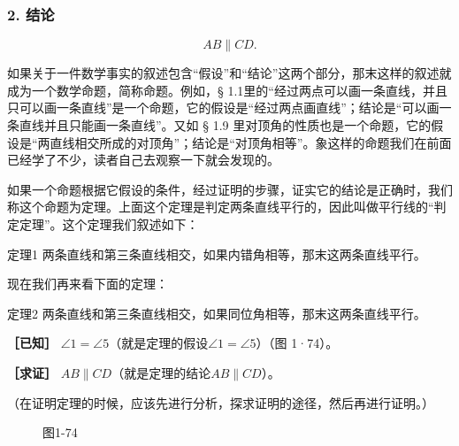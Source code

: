 \subsubsection{2. 结论}

\[
AB \parallel CD.
\]

如果关于一件数学事实的叙述包含``假设''和``结论''这两个部分，那末这样的叙述就成为一个数学命题，简称命题。例如，§
1.1里的``经过两点可以画一条直线，并且只可以画一条直线''是一个命题，它的假设是``经过两点画直线''；结论是``可以画一条直线并且只能画一条直线''。又如
§ 1.9
里对顶角的性质也是一个命题，它的假设是``两直线相交所成的对顶角''；结论是``对顶角相等''。象这样的命题我们在前面已经学了不少，读者自己去观察一下就会发现的。

如果一个命题根据它假设的条件，经过证明的步骤，证实它的结论是正确时，我们称这个命题为定理。上面这个定理是判定两条直线平行的，因此叫做平行线的``判定定理''。这个定理我们叙述如下：

定理1 两条直线和第三条直线相交，如果内错角相等，那末这两条直线平行。

现在我们再来看下面的定理：

定理2 两条直线和第三条直线相交，如果同位角相等，那末这两条直线平行。

\textbf{［已知］}
\(\angle 1 = \angle 5\)（就是定理的假设\(\angle 1 = \angle 5\)）（图
1·74）。

\textbf{［求证］}
\(AB \parallel CD\)（就是定理的结论\(AB \parallel CD\)）。

（在证明定理的时候，应该先进行分析，探求证明的途径，然后再进行证明。）

\begin{figure}
\centering
{}
\caption{图1-74}
\end{figure}

